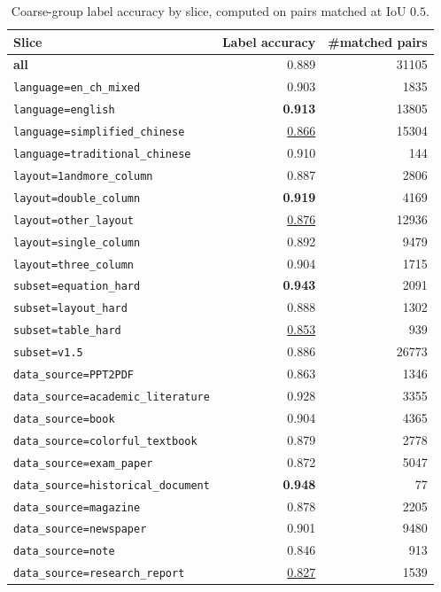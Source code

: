 \begin{table}[H]
\centering
\setlength{\abovecaptionskip}{4pt}
\setlength{\aboverulesep}{1.5pt}
\setlength{\belowrulesep}{1.5pt}
\renewcommand{\arraystretch}{0.95}
\caption{Coarse-group label accuracy by slice, computed on pairs matched at
IoU $0.5$.}
\label{tab:app-res-cls}
\scriptsize
\begin{tabular}{@{}l r r@{}}
\toprule
Slice & Label accuracy & \#matched pairs \\
\midrule
    \textbf{all} & 0.889 & 31105 \\ \midrule
    \texttt{language=en\_ch\_mixed} & 0.903 & 1835 \\
    \texttt{language=english} & \textbf{0.913} & 13805 \\
    \texttt{language=simplified\_chinese} & \underline{0.866} & 15304 \\
    \texttt{language=traditional\_chinese} & 0.910 & 144 \\
    \midrule
    \texttt{layout=1andmore\_column} & 0.887 & 2806 \\
    \texttt{layout=double\_column} & \textbf{0.919} & 4169 \\
    \texttt{layout=other\_layout} & \underline{0.876} & 12936 \\
    \texttt{layout=single\_column} & 0.892 & 9479 \\
    \texttt{layout=three\_column} & 0.904 & 1715 \\
    \midrule
    \texttt{subset=equation\_hard} & \textbf{0.943} & 2091 \\
    \texttt{subset=layout\_hard} & 0.888 & 1302 \\
    \texttt{subset=table\_hard} & \underline{0.853} & 939 \\
    \texttt{subset=v1.5} & 0.886 & 26773 \\
    \midrule
    \texttt{data\_source=PPT2PDF} & 0.863 & 1346 \\
    \texttt{data\_source=academic\_literature} & 0.928 & 3355 \\
    \texttt{data\_source=book} & 0.904 & 4365 \\
    \texttt{data\_source=colorful\_textbook} & 0.879 & 2778 \\
    \texttt{data\_source=exam\_paper} & 0.872 & 5047 \\
    \texttt{data\_source=historical\_document} & \textbf{0.948} & 77 \\
    \texttt{data\_source=magazine} & 0.878 & 2205 \\
    \texttt{data\_source=newspaper} & 0.901 & 9480 \\
    \texttt{data\_source=note} & 0.846 & 913 \\
    \texttt{data\_source=research\_report} & \underline{0.827} & 1539 \\
\bottomrule
\end{tabular}
\end{table}

